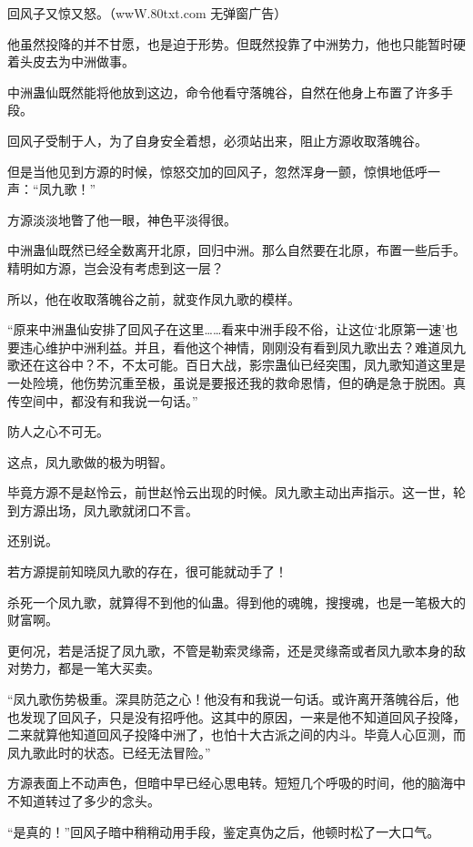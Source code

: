 
\begin{this_body}

回风子又惊又怒。（wwW.80txt.com 无弹窗广告）

他虽然投降的并不甘愿，也是迫于形势。但既然投靠了中洲势力，他也只能暂时硬着头皮去为中洲做事。

中洲蛊仙既然能将他放到这边，命令他看守落魄谷，自然在他身上布置了许多手段。

回风子受制于人，为了自身安全着想，必须站出来，阻止方源收取落魄谷。

但是当他见到方源的时候，惊怒交加的回风子，忽然浑身一颤，惊惧地低呼一声：“凤九歌！”

方源淡淡地瞥了他一眼，神色平淡得很。

中洲蛊仙既然已经全数离开北原，回归中洲。那么自然要在北原，布置一些后手。精明如方源，岂会没有考虑到这一层？

所以，他在收取落魄谷之前，就变作凤九歌的模样。

“原来中洲蛊仙安排了回风子在这里……看来中洲手段不俗，让这位‘北原第一速’也要违心维护中洲利益。并且，看他这个神情，刚刚没有看到凤九歌出去？难道凤九歌还在这谷中？不，不太可能。百日大战，影宗蛊仙已经突围，凤九歌知道这里是一处险境，他伤势沉重至极，虽说是要报还我的救命恩情，但的确是急于脱困。真传空间中，都没有和我说一句话。”

防人之心不可无。

这点，凤九歌做的极为明智。

毕竟方源不是赵怜云，前世赵怜云出现的时候。凤九歌主动出声指示。这一世，轮到方源出场，凤九歌就闭口不言。

还别说。

若方源提前知晓凤九歌的存在，很可能就动手了！

杀死一个凤九歌，就算得不到他的仙蛊。得到他的魂魄，搜搜魂，也是一笔极大的财富啊。

更何况，若是活捉了凤九歌，不管是勒索灵缘斋，还是灵缘斋或者凤九歌本身的敌对势力，都是一笔大买卖。

“凤九歌伤势极重。深具防范之心！他没有和我说一句话。或许离开落魄谷后，他也发现了回风子，只是没有招呼他。这其中的原因，一来是他不知道回风子投降，二来就算他知道回风子投降中洲了，也怕十大古派之间的内斗。毕竟人心叵测，而凤九歌此时的状态。已经无法冒险。”

方源表面上不动声色，但暗中早已经心思电转。短短几个呼吸的时间，他的脑海中不知道转过了多少的念头。

“是真的！”回风子暗中稍稍动用手段，鉴定真伪之后，他顿时松了一大口气。


\end{this_body}
